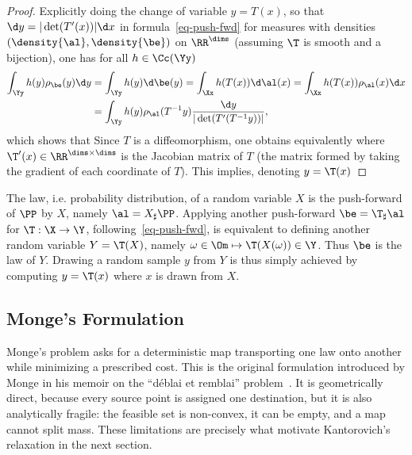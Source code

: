\begin{proof}
Explicitly doing the change of variable $y=T(x)$, so that $\d y = |\det(T'(x))| \d x$ in formula~\eqref{eq-push-fwd} for measures with densities $(\density{\al},\density{\be})$ on $\RR^\dims$ (assuming $\T$ is smooth and a bijection), one has for all $h \in \Cc(\Yy)$
\begin{align*}
	\int_\Yy h(y)\rho_\be(y) \d y &= \int_\Yy h(y) \d \be(y) = \int_\Xx h(T(x)) \d \al(x) = \int_\Xx h(T(x)) \rho_\al(x) \d x \\
		&= \int_\Yy h(y) \rho_\al(T^{-1}y) \frac{\d y}{|\det(T'( T^{-1} y))|},
\end{align*}
which shows that
Since $T$ is a diffeomorphism, one obtains equivalently
where $\T'(x) \in \RR^{\dims \times \dims}$ is the Jacobian matrix of $T$ (the matrix formed by taking the gradient of each coordinate of $T$).
%
This implies, denoting $y=\T(x)$
\end{proof}


\begin{rem}
The law, i.e. probability distribution, of a random variable $X$ is the push-forward of $\PP$ by $X$, namely $\al=X_\sharp\PP$.
%
Applying another push-forward $\be = \T_\sharp\al$ for $\T : \X \rightarrow \Y$, following~\eqref{eq-push-fwd}, is equivalent to defining another random variable $Y=\T(X)$, namely $\omega \in \Om \mapsto \T(X(\omega)) \in \Y$. Thus $\be$ is the law of $Y$.
%
Drawing a random sample $y$ from $Y$ is thus simply achieved by computing $y=\T(x)$ where $x$ is drawn from $X$.
\end{rem}

\subsection{Monge's Formulation}
\label{sec-monge-formulation}
\label{sec-continuous-monge}

Monge's problem asks for a deterministic map transporting one law onto another while minimizing a prescribed cost. This is the original formulation introduced by Monge in his memoir on the ``d\'eblai et remblai'' problem~\cite{Monge1781}. It is geometrically direct, because every source point is assigned one destination, but it is also analytically fragile: the feasible set is non-convex, it can be empty, and a map cannot split mass. These limitations are precisely what motivate Kantorovich's relaxation in the next section.

